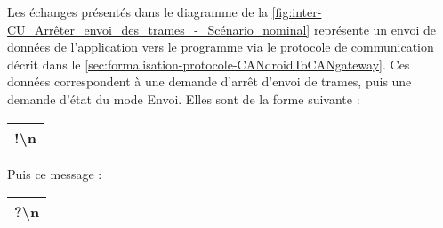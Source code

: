 \medspace

Les échanges présentés dans le diagramme de la \autoref{fig:inter-CU_Arrêter_envoi_des_trames_-_Scénario_nominal} représente un envoi de données de l'application {\nomApplication} vers le programme {\nomLogiciel} via le protocole de communication décrit dans le \autoref{sec:formalisation-protocole-CANdroidToCANgateway}. Ces données correspondent à une demande d'arrêt d'envoi de trames, puis une demande d'état du mode Envoi. Elles sont de la forme suivante  :\\

\begin{minipage}
    \textwidth
    \centering
    \begin{tabular}{|c|}
        \hline
        !\textbackslash n\\
        \hline
    \end{tabular}
\end{minipage}

\medspace

Puis ce message :

\medspace

\begin{minipage}
    \textwidth
    \centering
    \begin{tabular}{|c|}
        \hline
        ?\textbackslash n\\
        \hline
    \end{tabular}
\end{minipage}